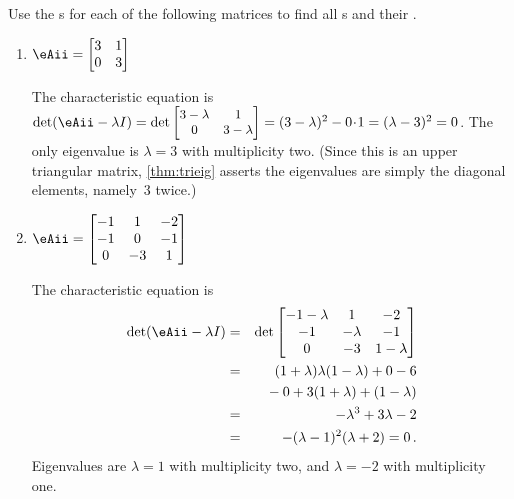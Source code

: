 \begin{example} \label{eg:faem}
Use the s for each of the following matrices to find all s and their .
\begin{enumerate}
\item\label{eg:faem:a} \(\eAii=\begin{bmatrix} 3&1\\0&3 \end{bmatrix}\)
\begin{solution}The characteristic equation is \(\det(\eAii-\lambda I)
=\det{\small\begin{bmatrix} 3-\lambda&1\\0&3-\lambda \end{bmatrix}}
=(3-\lambda)^2-0\cdot1=(\lambda-3)^2=0\). 
The only eigenvalue is \(\lambda=3\) with multiplicity two.
(Since this is an upper triangular matrix, \autoref{thm:trieig} asserts the eigenvalues are simply the diagonal elements, namely~\(3\) twice.)
\end{solution}

\item\label{eg:faem:b} \(\eAii=\begin{bmatrix}-1&1&-2
\\-1&0&-1
\\0&-3&1 \end{bmatrix}\)
\begin{solution}The characteristic equation is 
\begin{eqnarray*}
\det(\eAii-\lambda I)
&=&\det\begin{bmatrix}-1-\lambda&1&-2
\\-1&-\lambda&-1
\\0&-3&1-\lambda\end{bmatrix}
\\&=&(1+\lambda)\lambda(1-\lambda)+0-6
\\&&{}
-0+3(1+\lambda)+(1-\lambda)
\\&=&-\lambda^3+3\lambda-2
\\&=&-(\lambda-1)^2(\lambda+2)=0\,.
\end{eqnarray*}
Eigenvalues are \(\lambda=1\) with multiplicity two, and \(\lambda=-2\) with multiplicity one.
\end{solution}



\end{enumerate}
\end{example}
